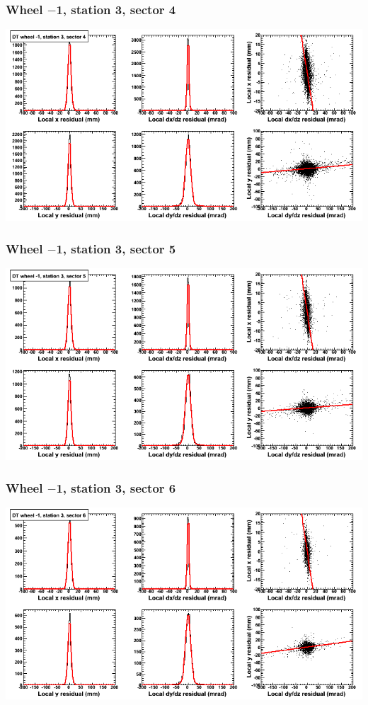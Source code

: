 \documentclass[compress]{beamer}
\begin{document}
\begin{frame}
\frametitle{Wheel $-$1, station 3, sector 4}
\includegraphics[width=\linewidth]{tmpbell_MBwhBst3sec04.png}
\end{frame}

\begin{frame}
\frametitle{Wheel $-$1, station 3, sector 5}
\includegraphics[width=\linewidth]{tmpbell_MBwhBst3sec05.png}
\end{frame}

\begin{frame}
\frametitle{Wheel $-$1, station 3, sector 6}
\includegraphics[width=\linewidth]{tmpbell_MBwhBst3sec06.png}
\end{frame}
\end{document}
